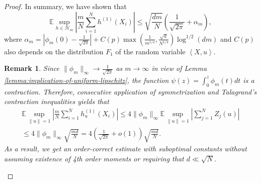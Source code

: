 \documentclass[12pt]{article}
\def\l{\left}
\def\r{\right}
\newcommand{\m}{\mathcal}
\newcommand{\mb}{\mathbb}
\newcommand{\dotp}[2]{\left\langle#1,#2\right\rangle}
\theoremstyle{thmstyletwo}%
\newtheorem{remark}{Remark}%
\theoremstyle{thmstylethree}%
\begin{document}
\begin{proof}
\noindent In summary, we have shown that 
\begin{equation}
    \label{eq:expection}
    \mb E\sup_{h\in \m H_m}\l|\frac{m}{N} \sum_{i=1}^N h^{(1)}\l(X_i\r)\r| \leq 
    \sqrt{\frac{dm}{N}}\l( \frac{1}{\sqrt{2\pi}} + \alpha_m\r), 
\end{equation}
where $\alpha_m = \l| \phi_m(0) - \frac{1}{\sqrt{2\pi}}\r| + C(p)\max\l(\frac{1}{m^{1/4}},\frac{\sqrt{d}}{N^{1/4}}\r)\log^{1/2}(dm)$ and $C(p)$ also depends on the distribution $F_1$ of the random variable $\dotp{X}{u}$. 
\begin{remark}
        \label{remark:expectation-simple}
        Since $\|\phi_m\|_\infty \to \frac{1}{\sqrt{2\pi}}$ as $m\to\infty$  in view of Lemma \ref{lemma:implication-of-uniform-lipschitz}, the function $\psi(z)=\int_0^z \phi_m(t)dt$ is a contraction. Therefore, consecutive application of symmetrization and Talagrand's contraction inequalities yields that 
        \begin{multline*}
        \mb E\sup_{\|u\|=1}\l|\frac{m}{N} \sum_{i=1}^N h_u^{(1)}\l(X_i\r)\r| \leq 4 \|\phi_m\|_\infty \mb E\sup_{\|u\|=1}\l| \sum_{j=1}^N Z_j(u)\r| 
        \\
        \leq 4 \|\phi_m\|_\infty \sqrt{\frac{md}{N}} = 4 \l(\frac{1}{\sqrt{2\pi}} +o(1)\r) \sqrt{\frac{md}{N}}.
        \end{multline*}
    As a result, we get an order-correct estimate with suboptimal constants without assuming existence of 4th order moments or requiring that $d\ll \sqrt{N}$. 
    \end{remark}



\end{proof}
\end{document}
